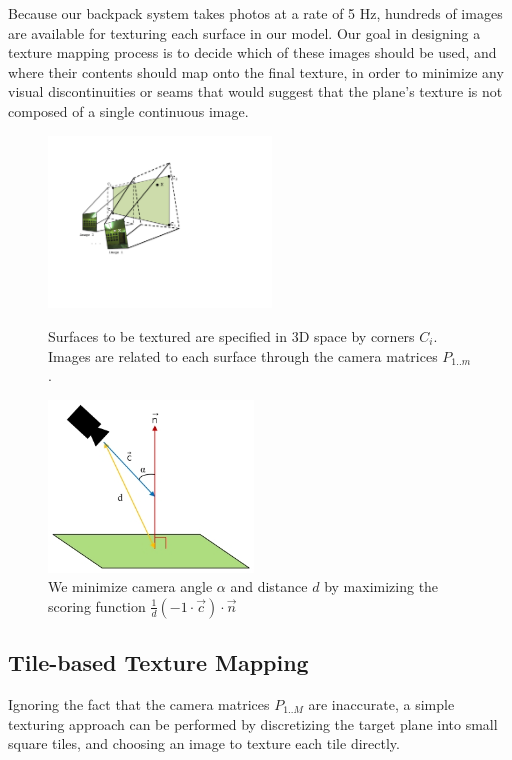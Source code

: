 \documentclass[]{spie}  %
\begin{document}
Because our backpack system takes photos at a rate of 5 Hz, hundreds
of images are available for texturing each surface in our model. Our
goal in designing a texture mapping process is to decide which of
these images should be used, and where their contents should map onto
the final texture, in order to minimize any visual discontinuities or
seams that would suggest that the plane's texture is not composed of a
single continuous image.

\begin{figure}
  \begin{minipage}[b]{0.45\linewidth}
    \centering
    \includegraphics[height=1.8in]{Projection.pdf}
    \caption{Surfaces to be textured are specified in 3D space by
      corners $C_i$. Images are related to each surface through the
      camera matrices $P_{1..m}$. }
    \label{fig:projection}
  \end{minipage}
  \hspace{0.5cm}
  \begin{minipage}[b]{0.45\linewidth}
    \centering
    \includegraphics[height=1.8in]{scoringFunction.jpg}
    \caption{We minimize camera angle $\alpha$ and distance $d$ by
      maximizing the scoring function $\frac{1}{d} (-1 \cdot \vec{c})
      \cdot \vec{n}$}
    \label{fig:scoringFunction}
  \end{minipage}
\end{figure}


\subsection{Tile-based Texture Mapping}
\label{sec:tileBasedMapping}
Ignoring the fact that the camera matrices $P_{1..M}$ are inaccurate,
a simple texturing approach can be performed by discretizing the
target plane into small square tiles, and choosing an image to texture
each tile directly.
\end{document}
